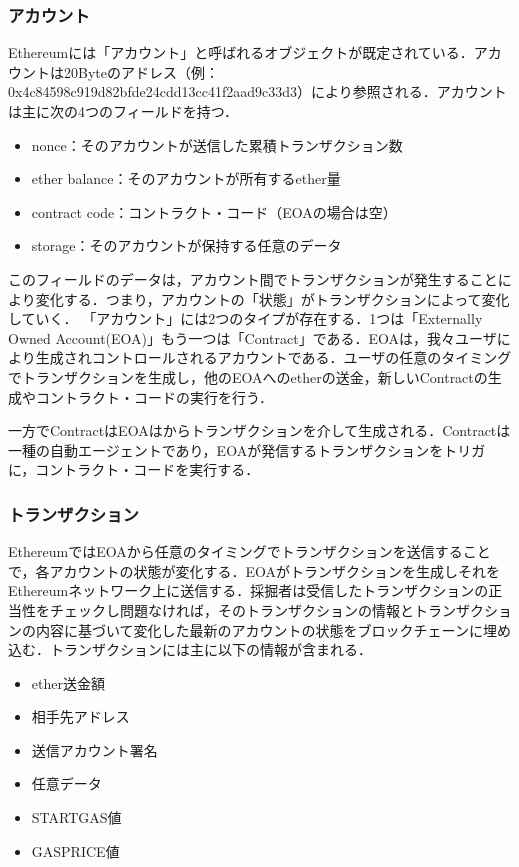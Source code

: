 \subsubsection*{アカウント}
Ethereumには「アカウント」と呼ばれるオブジェクトが既定されている．アカウントは20Byteのアドレス（例：0x4c84598c919d82bfde24cdd13cc41f2aad9c33d3）により参照される．アカウントは主に次の4つのフィールドを持つ．
\begin{itemize}
\item nonce：そのアカウントが送信した累積トランザクション数

\item ether balance：そのアカウントが所有するether量

\item contract code：コントラクト・コード（EOAの場合は空）

\item storage：そのアカウントが保持する任意のデータ
\end{itemize}

このフィールドのデータは，アカウント間でトランザクションが発生することにより変化する．つまり，アカウントの「状態」がトランザクションによって変化していく．
「アカウント」には2つのタイプが存在する．1つは「Externally Owned Account(EOA)」もう一つは「Contract」である．EOAは，我々ユーザにより生成されコントロールされるアカウントである．ユーザの任意のタイミングでトランザクションを生成し，他のEOAへのetherの送金，新しいContractの生成やコントラクト・コードの実行を行う．

一方でContractはEOAはからトランザクションを介して生成される．Contractは一種の自動エージェントであり，EOAが発信するトランザクションをトリガに，コントラクト・コードを実行する．

\newpage

\subsubsection*{トランザクション}
EthereumではEOAから任意のタイミングでトランザクションを送信することで，各アカウントの状態が変化する．EOAがトランザクションを生成しそれをEthereumネットワーク上に送信する．採掘者は受信したトランザクションの正当性をチェックし問題なければ，そのトランザクションの情報とトランザクションの内容に基づいて変化した最新のアカウントの状態をブロックチェーンに埋め込む．トランザクションには主に以下の情報が含まれる．
\begin{itemize}
\item ether送金額
\item 相手先アドレス
\item 送信アカウント署名
\item 任意データ
\item STARTGAS値
\item GASPRICE値
\end{itemize}

